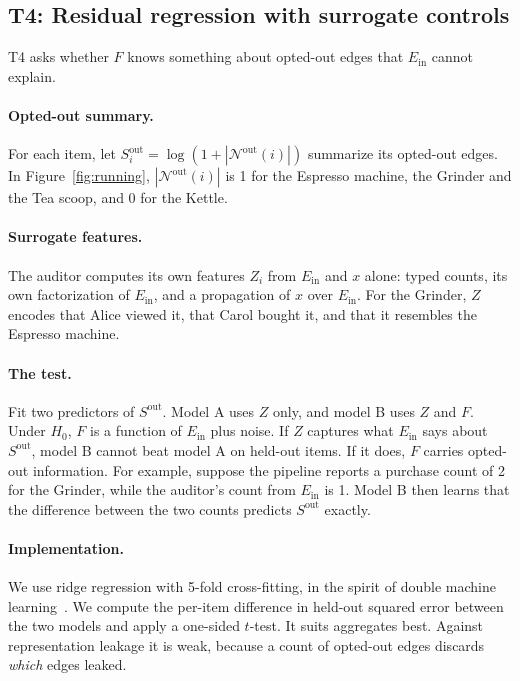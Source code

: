 \documentclass[10pt,twocolumn,letterpaper]{article}
\theoremstyle{definition}
\newcommand{\Ein}{E_{\mathrm{in}}}
\newcommand{\N}{\mathcal{N}}
\begin{document}
\subsection{T4: Residual regression with surrogate controls}
T4 asks whether $F$ knows something about opted-out edges that $\Ein$ cannot
explain.

\paragraph{Opted-out summary.}
For each item, let $S^{\mathrm{out}}_i=\log(1+|\N^{\mathrm{out}}(i)|)$ summarize its opted-out
edges. In Figure~\ref{fig:running}, $|\N^{\mathrm{out}}(i)|$ is 1 for the Espresso machine,
the Grinder and the Tea scoop, and 0 for the Kettle.

\paragraph{Surrogate features.}
The auditor computes its own features $Z_i$ from $\Ein$ and $x$ alone: typed
counts, its own factorization of $\Ein$, and a propagation of $x$ over $\Ein$. For
the Grinder, $Z$ encodes that Alice viewed it, that Carol bought it, and that
it resembles the Espresso machine.

\paragraph{The test.}
Fit two predictors of $S^{\mathrm{out}}$. Model A uses $Z$ only, and model B uses $Z$ and
$F$. Under $H_0$, $F$ is a function of $\Ein$ plus noise. If $Z$ captures what $\Ein$
says about $S^{\mathrm{out}}$, model B cannot beat model A on held-out items. If it does,
$F$ carries opted-out information. For example, suppose the pipeline reports a
purchase count of 2 for the Grinder, while the auditor's count from $\Ein$ is 1.
Model B then learns that the difference between the two counts predicts
$S^{\mathrm{out}}$ exactly.

\paragraph{Implementation.}
We use ridge regression with 5-fold cross-fitting, in the spirit of double
machine learning~\citep{chernozhukov2018double}. We compute the per-item
difference in held-out squared error between the two models and apply a
one-sided $t$-test. It suits aggregates best. Against representation leakage
it is weak, because a count of opted-out edges discards \emph{which} edges
leaked.
\end{document}
